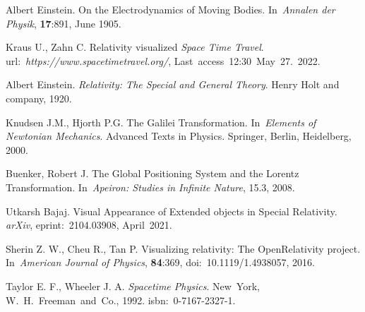 \documentclass{egpubl}
\begin{document}
\begin{thebibliography}{1}
 Albert Einstein.
\newblock On the Electrodynamics of Moving Bodies.
In~\emph{Annalen der Physik}, \textbf{17}:891, June 1905.

 Kraus U., Zahn C.
\newblock Relativity visualized \emph{Space Time Travel}.
url:~\emph{https://www.spacetimetravel.org/}, Last~access~12:30~May~27.~2022.

 Albert Einstein.
\newblock \emph{Relativity: The Special and General Theory}.
Henry Holt and company, 1920.

 Knudsen J.M., Hjorth P.G. The Galilei Transformation.
In~\emph{Elements of Newtonian Mechanics}. Advanced Texts in Physics. Springer, Berlin, Heidelberg, 2000.

 Buenker, Robert J.
\newblock The Global Positioning System and the Lorentz Transformation.
In~\emph{Apeiron: Studies in Infinite Nature}, 15.3, 2008.

 Utkarsh Bajaj.
\newblock Visual Appearance of Extended objects in Special Relativity.
\emph{arXiv}, eprint:~2104.03908, April~2021.

 Sherin Z. W., Cheu R., Tan P.
\newblock Visualizing relativity: The OpenRelativity project. In~\emph{American Journal of Physics}, \textbf{84}:369, doi:~10.1119/1.4938057, 2016.

 Taylor E. F., Wheeler J. A.
\newblock \emph{Spacetime Physics}.
New~York, W.~H.~Freeman~and~Co., 1992.
isbn:~0-7167-2327-1.

\end{thebibliography}
\end{document}
